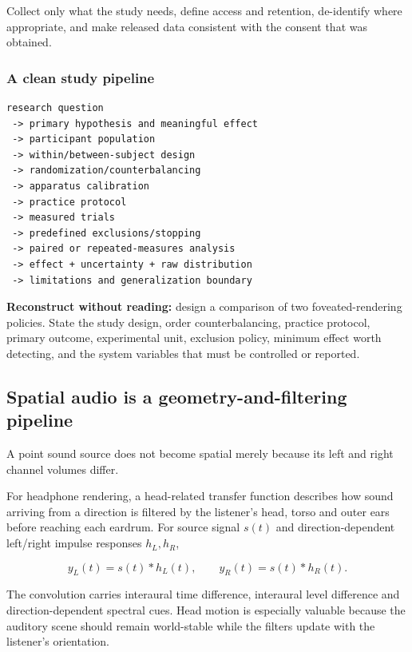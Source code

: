 Collect only what the study needs, define access and retention, de-identify where appropriate, and make released data consistent with the consent that was obtained.

\subsubsection{A clean study pipeline}\label{04-visual-computing-ii-ch035-a-clean-study-pipeline}

\begin{verbatim}
research question
 -> primary hypothesis and meaningful effect
 -> participant population
 -> within/between-subject design
 -> randomization/counterbalancing
 -> apparatus calibration
 -> practice protocol
 -> measured trials
 -> predefined exclusions/stopping
 -> paired or repeated-measures analysis
 -> effect + uncertainty + raw distribution
 -> limitations and generalization boundary
\end{verbatim}

\textbf{Reconstruct without reading:} design a comparison of two foveated-rendering policies. State the study design, order counterbalancing, practice protocol, primary outcome, experimental unit, exclusion policy, minimum effect worth detecting, and the system variables that must be controlled or reported.

\subsection{Spatial audio is a geometry-and-filtering pipeline}\label{04-visual-computing-ii-ch035-spatial-audio-is-a-geometry-and-filtering-pipeline}

A point sound source does not become spatial merely because its left and right channel volumes differ.

For headphone rendering, a head-related transfer function describes how sound arriving from a direction is filtered by the listener's head, torso and outer ears before reaching each eardrum. For source signal \(s(t)\) and direction-dependent left/right impulse responses \(h_L,h_R\),

\[
y_L(t)=s(t)*h_L(t),\qquad
y_R(t)=s(t)*h_R(t).
\]

The convolution carries interaural time difference, interaural level difference and direction-dependent spectral cues. Head motion is especially valuable because the auditory scene should remain world-stable while the filters update with the listener's orientation.

